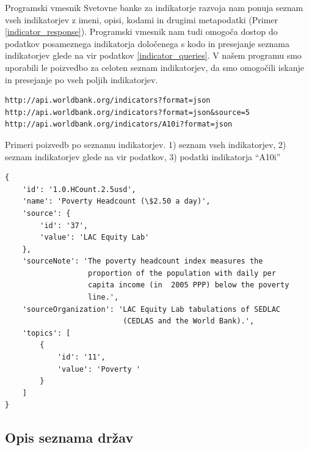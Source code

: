 Programski vmesnik Svetovne banke za indikatorje razvoja nam ponuja seznam 
vseh indikatorjev z imeni, opisi, kodami in drugimi metapodatki 
(Primer \ref{indicator_response}). Programski vmesnik nam tudi omogoča dostop
do podatkov posameznega indikatorja določenega s kodo in presejanje seznama 
indikatorjev glede na vir podatkov \ref{indicator_queries}. V našem programu
smo uporabili le poizvedbo za celoten seznam indikatorjev, da smo omogočili 
iskanje in presejanje po vseh poljih indikatorjev.

\begin{snippet}
\begin{center}
\begin{lstlisting}
http://api.worldbank.org/indicators?format=json
http://api.worldbank.org/indicators?format=json&source=5
http://api.worldbank.org/indicators/A10i?format=json
\end{lstlisting}
\end{center}
\caption{Primeri poizvedb po seznamu indikatorjev.
1) seznam vseh indikatorjev, 2) seznam indikatorjev glede na vir podatkov,
3) podatki indikatorja ``A10i''}
\label{indicator_queries}
\end{snippet} 


\begin{snippet}
\begin{center}
\begin{lstlisting}
{
    'id': '1.0.HCount.2.5usd',
    'name': 'Poverty Headcount (\$2.50 a day)',
    'source': {
        'id': '37',
        'value': 'LAC Equity Lab'
    },
    'sourceNote': 'The poverty headcount index measures the 
                   proportion of the population with daily per 
                   capita income (in  2005 PPP) below the poverty
                   line.',
    'sourceOrganization': 'LAC Equity Lab tabulations of SEDLAC 
                           (CEDLAS and the World Bank).',
    'topics': [
        {
            'id': '11',
            'value': 'Poverty '
        }
    ]
}
\end{lstlisting}
\end{center}
\caption{Podatki indikatorja 
stopnja revščine pri dohodku 2,5 dolarja na dan.}
\label{indicator_response}
\end{snippet} 

\subsection{Opis seznama držav}


